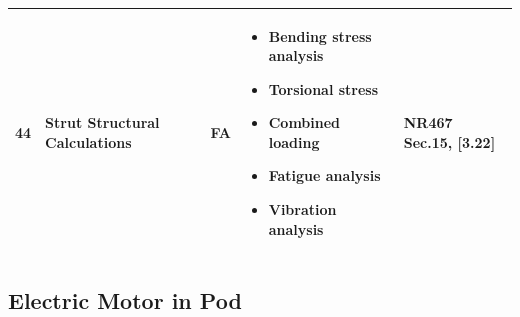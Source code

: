 \documentclass[11pt,a4paper]{report}
\newcommand{\fa}{\textbf{\textcolor{warningred}{FA}}}
\begin{document}
\begin{longtable}{|p{0.5cm}|p{5cm}|p{1.5cm}|p{5.5cm}|p{2cm}|}
44 & Strut Structural Calculations & \fa{} & 
\begin{itemize}[leftmargin=*,nosep]
\item Bending stress analysis
\item Torsional stress
\item Combined loading
\item Fatigue analysis
\item Vibration analysis
\end{itemize} & NR467 Sec.15, [3.22] \\
\hline

\end{longtable}

\subsection{Electric Motor in Pod}
\end{document}
